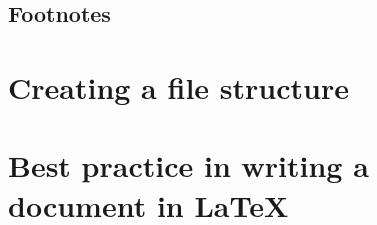 \subsection{Footnotes}


\section{Creating a file structure}\label{sec:FileStructure}


\section{Best practice in writing a document in LaTeX}
